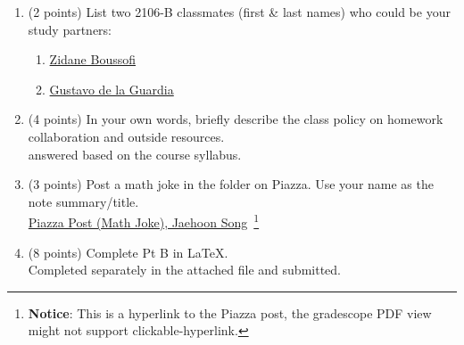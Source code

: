\begin{enumerate}[label=\arabic*.]
  \item (2 points) List two 2106-B classmates (first \& last names) 
  who could be your study partners:
  \begin{enumerate}
    \item \href{mailto:zboussofi3@gatech.edu}{{\color{bluecolor}Zidane Boussofi}}
    \item \href{mailto:gfabrega3@gatech.edu}{{\color{bluecolor}Gustavo de la Guardia}}
  \end{enumerate}
  
  \item (4 points) In your own words, briefly describe the class 
  policy on homework collaboration and outside resources.\\
  {\color{bluecolor} answered 
  based on the course syllabus.}


  \item (3 points) Post a math joke in the  folder on Piazza.
  Use your name as the note summary/title. \\
  \href{https://piazza.com/class/mehdkib2u08cx/post/19}{{\color{bluecolor}Piazza Post (Math Joke)}, Jaehoon Song}~\footnote{
    \textbf{Notice}: This is a hyperlink to the Piazza post, the gradescope PDF 
    view might not support clickable-hyperlink.}
  \item (8 points) Complete Pt B in \LaTeX. \\
  {\color{bluecolor}Completed separately in the attached file and submitted.}
\end{enumerate}